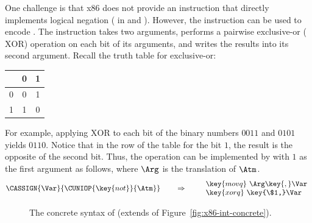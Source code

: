 \documentclass[7x10]{TimesAPriori_MIT}%
\newcommand{\gray}[1]{{\color{gray} #1}}
\def\racketEd{0}
\def\pythonEd{1}
\def\edition{1}
\newcommand{\racket}[1]{{\if\edition\racketEd{#1}\fi}}
\newcommand{\python}[1]{{\if\edition\pythonEd #1\fi}}
\begin{document}
One challenge is that x86 does not provide an instruction that
directly implements logical negation ( in \LangIf{} and
\LangCIf{}).  However, the  instruction can be used to
encode .  The  instruction takes two arguments,
performs a pairwise exclusive-or ($\mathrm{XOR}$) operation on each
bit of its arguments, and writes the results into its second argument.
Recall the truth table for exclusive-or:
\begin{center}
\begin{tabular}{l|cc}
   & 0 & 1 \\ \hline
0  & 0 & 1 \\
1  & 1 & 0
\end{tabular}
\end{center}
For example, applying $\mathrm{XOR}$ to each bit of the binary numbers
$0011$ and $0101$ yields $0110$. Notice that in the row of the table
for the bit $1$, the result is the opposite of the second bit.  Thus,
the  operation can be implemented by  with $1$ as
the first argument as follows, where $\Arg$ is the translation of
$\Atm$.
\[
\CASSIGN{\Var}{\CUNIOP{\key{not}}{\Atm}}
\qquad\Rightarrow\qquad
\begin{array}{l}
\key{movq}~ \Arg\key{,} \Var\\
\key{xorq}~ \key{\$1,} \Var
\end{array}
\]


\begin{figure}[tp]
\fbox{
\begin{minipage}{0.96\textwidth}
\[
\begin{array}{lcl}
  \itm{bytereg} &::=& \key{ah} \MID \key{al} \MID \key{bh} \MID \key{bl}
    \MID \key{ch} \MID \key{cl} \MID \key{dh} \MID \key{dl} \\
\Arg &::=& \gray{ \key{\$}\Int \MID \key{\%}\Reg \MID \Int\key{(}\key{\%}\Reg\key{)} } \MID \key{\%}\itm{bytereg}\\
\itm{cc} & ::= & \key{e} \MID \key{l} \MID \key{le} \MID \key{g} \MID \key{ge} \\
\Instr &::=& \gray{ \key{addq} \; \Arg\key{,} \Arg \MID
      \key{subq} \; \Arg\key{,} \Arg \MID
      \key{negq} \; \Arg \MID \key{movq} \; \Arg\key{,} \Arg \MID } \\
  &&  \gray{ \key{callq} \; \itm{label} \MID
      \key{pushq}\;\Arg \MID \key{popq}\;\Arg \MID \key{retq} \MID \racket{\key{jmp}\,\itm{label} \MID} } \python{\key{jmp}\,\itm{label} \MID}  \\
  && \racket{\gray{ \itm{label}\key{:}\; \Instr }}\python{\itm{label}\key{:}\; \Instr}
     \MID \key{xorq}~\Arg\key{,}~\Arg
     \MID \key{cmpq}~\Arg\key{,}~\Arg  \MID \\
  &&  \key{set}cc~\Arg
     \MID \key{movzbq}~\Arg\key{,}~\Arg
     \MID \key{j}cc~\itm{label}
     \\
\LangXIfM{} &::= & \gray{ \key{.globl main} }\\
      &    & \gray{ \key{main:} \; \Instr\ldots }
\end{array}
\]
\end{minipage}
}
\caption{The concrete syntax of \LangXIf{}  (extends \LangXInt{} of Figure~\ref{fig:x86-int-concrete}).}
\label{fig:x86-1-concrete}
\end{figure}
\end{document}
